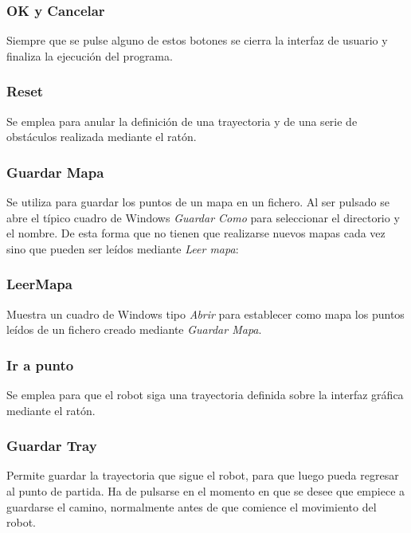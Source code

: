 \subsubsection{OK y Cancelar}

\noindent
Siempre que se pulse alguno de estos botones se cierra la interfaz de usuario y finaliza la ejecución del programa.

\subsubsection{Reset}
\noindent
Se emplea para anular la definición de una trayectoria y de una serie de obstáculos realizada mediante el ratón.

\subsubsection{Guardar Mapa}

\noindent
Se utiliza para guardar los puntos de un mapa en un fichero. Al ser pulsado se abre el típico cuadro de Windows \emph{Guardar Como} para seleccionar el directorio y el nombre. De esta forma que no tienen que realizarse nuevos mapas cada vez sino que pueden ser leídos mediante \emph{Leer mapa}:

\subsubsection{LeerMapa}

\noindent
Muestra un cuadro de Windows tipo \emph{Abrir} para establecer como mapa los puntos leídos de un fichero creado mediante \emph{Guardar Mapa}.

\subsubsection{Ir a punto}

\noindent
Se emplea para que el robot siga una trayectoria definida sobre la interfaz gráfica mediante el ratón.

\subsubsection{Guardar Tray}

\noindent
Permite guardar la trayectoria que sigue el robot, para que luego pueda regresar al punto de partida. Ha de pulsarse en el momento en que se desee que empiece a guardarse el camino, normalmente antes de que comience el movimiento del robot.

